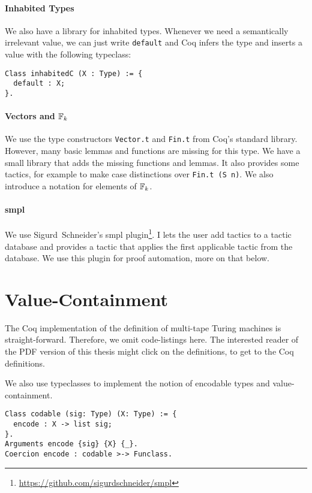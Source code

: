 \paragraph{Inhabited Types}
We also have a library for inhabited types.  Whenever we need a semantically irrelevant value, we can just write \lstinline!default! and Coq infers
the type and inserts a value with the following typeclass:
\begin{lstlisting}
Class inhabitedC (X : Type) := {
  default : X;
}.
\end{lstlisting}

\paragraph{Vectors and $\mathbb{F}_k$}

We use the type constructors \lstinline!Vector.t! and \lstinline!Fin.t! from Coq's standard library.  However, many basic lemmas and functions are
missing for this type.  We have a small library that adds the missing functions and lemmas.  It also provides some tactics, for example to make case
distinctions over \lstinline!Fin.t (S n)!.  We also introduce a notation for elements of $\mathbb{F}_k$.

\paragraph{smpl}

We use Sigurd~Schneider's smpl plugin\footnote{\url{https://github.com/sigurdschneider/smpl}}.  I lets the user add tactics to a tactic database and
provides a tactic that applies the first applicable tactic from the database.  We use this plugin for proof automation, more on that below.


\section*{Value-Containment}
\label{sec:coq-values}

The Coq implementation of the definition of multi-tape Turing machines is straight-forward.  Therefore, we omit code-listings here.  The interested
reader of the PDF version of this thesis might click on the definitions, to get to the Coq definitions.

We also use typeclasses to implement the notion of encodable types and value-containment.

\begin{lstlisting}
Class codable (sig: Type) (X: Type) := {
  encode : X -> list sig;
}.
Arguments encode {sig} {X} {_}.
Coercion encode : codable >-> Funclass.
\end{lstlisting}

